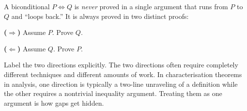 \begin{remark}
A biconditional $P \Leftrightarrow Q$ is \emph{never} proved in a single
argument that runs from $P$ to $Q$ and ``loops back.'' It is always
proved in two distinct proofs:

\medskip
\noindent \textbf{($\Rightarrow$)} Assume $P$. Prove $Q$.

\noindent \textbf{($\Leftarrow$)} Assume $Q$. Prove $P$.

\medskip
\noindent
Label the two directions explicitly. The two directions often require
completely different techniques and different amounts of work.
In characterisation theorems in analysis, one direction is typically
a two-line unraveling of a definition while the other requires a
nontrivial inequality argument. Treating them as one argument is how
gaps get hidden.
\end{remark}
